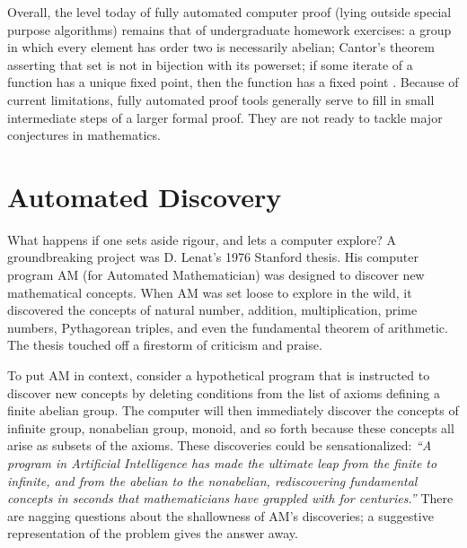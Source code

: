 \documentclass{llncs}
\begin{document}
\bigskip


Overall, the level today of fully automated computer proof (lying outside
special purpose algorithms) remains that of undergraduate
homework exercises: a group in which every element has order two is necessarily abelian; Cantor's theorem asserting that set is not in bijection with its powerset; 
%
if some iterate of a function has a unique fixed point, then
the function has a fixed point \cite{TPS}.
Because of current limitations, fully automated proof tools
generally serve to fill in small intermediate steps of a
larger formal proof.  They are not ready to tackle major conjectures
in mathematics.

\section{Automated Discovery}

What happens if one sets aside rigour, and lets a computer explore?
A groundbreaking project was D. Lenat's 1976 Stanford thesis.
His computer program AM (for Automated Mathematician) was
designed to discover new mathematical concepts.  When AM was set loose to explore in the wild, it discovered the concepts of natural number, addition, multiplication, prime numbers, Pythagorean triples, and even the fundamental theorem of arithmetic.
The thesis touched off a firestorm of criticism and praise.

To put AM in context, consider a hypothetical program that is instructed to discover new concepts by deleting conditions
from the list of axioms defining a finite abelian group.  The computer will then immediately discover the concepts
of infinite  group,  nonabelian group,  monoid, and so forth because these concepts all
arise as subsets of the axioms.  These discoveries could be sensationalized:
{\it ``A program in Artificial Intelligence 
has made the ultimate leap from the finite to infinite, and from the abelian to the nonabelian,
rediscovering fundamental concepts in seconds that mathematicians have grappled with for centuries.''}
There are nagging questions about the shallowness of AM's discoveries; a
suggestive representation of the problem gives the answer away.
\end{document}
